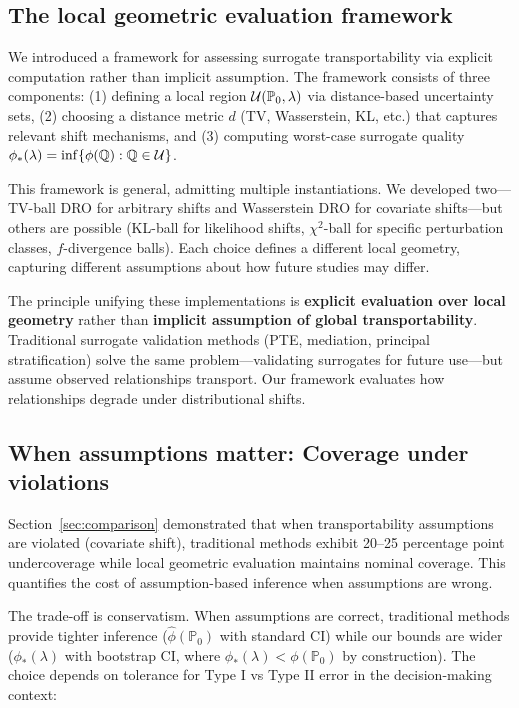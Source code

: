 \documentclass{article}
\newcommand{\PP}{\mathbb{P}}
\begin{document}
\subsection{The local geometric evaluation framework}

We introduced a framework for assessing surrogate transportability via explicit computation rather than implicit assumption. The framework consists of three components: (1) defining a local region $\cU(\PP_0, \lambda)$ via distance-based uncertainty sets, (2) choosing a distance metric $d$ (TV, Wasserstein, KL, etc.) that captures relevant shift mechanisms, and (3) computing worst-case surrogate quality $\phi_*(\lambda) = \inf\{\phi(\mathbb{Q}) : \mathbb{Q} \in \mathcal{U}\}$.

This framework is general, admitting multiple instantiations. We developed two---TV-ball DRO for arbitrary shifts and Wasserstein DRO for covariate shifts---but others are possible (KL-ball for likelihood shifts, $\chi^2$-ball for specific perturbation classes, $f$-divergence balls). Each choice defines a different local geometry, capturing different assumptions about how future studies may differ.

The principle unifying these implementations is \textbf{explicit evaluation over local geometry} rather than \textbf{implicit assumption of global transportability}. Traditional surrogate validation methods (PTE, mediation, principal stratification) solve the same problem---validating surrogates for future use---but assume observed relationships transport. Our framework evaluates how relationships degrade under distributional shifts.

\subsection{When assumptions matter: Coverage under violations}

Section~\ref{sec:comparison} demonstrated that when transportability assumptions are violated (covariate shift), traditional methods exhibit 20--25 percentage point undercoverage while local geometric evaluation maintains nominal coverage. This quantifies the cost of assumption-based inference when assumptions are wrong.

The trade-off is conservatism. When assumptions are correct, traditional methods provide tighter inference ($\hat{\phi}(\PP_0)$ with standard CI) while our bounds are wider ($\phi_*(\lambda)$ with bootstrap CI, where $\phi_*(\lambda) < \phi(\PP_0)$ by construction). The choice depends on tolerance for Type I vs Type II error in the decision-making context:
\end{document}
